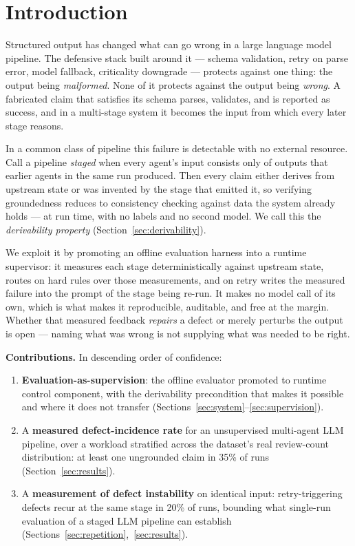 \documentclass[runningheads]{llncs}
\begin{document}
\section{Introduction}
\label{sec:intro}

Structured output has changed what can go wrong in a large language model
pipeline. The defensive stack built around it --- schema validation, retry on
parse error, model fallback, criticality downgrade --- protects against one
thing: the output being \emph{malformed}. None of it protects against the output
being \emph{wrong}. A
fabricated claim that satisfies its schema parses, validates, and is reported as
success, and in a multi-stage system it becomes the input from which every later
stage reasons.

In a common class of pipeline this failure is detectable with no external
resource. Call a pipeline \emph{staged} when every agent's input consists only of
outputs that earlier agents in the same run produced. Then every claim either
derives from upstream state or was invented by the stage that emitted it, so
verifying groundedness reduces to consistency checking against data the system
already holds --- at run time, with no labels and no second model. We call this
the \emph{derivability property} (Section~\ref{sec:derivability}).

We exploit it by promoting an offline evaluation harness into a runtime
supervisor: it measures each stage deterministically against upstream state,
routes on hard rules over those measurements, and on retry writes the measured
failure into the prompt of the stage being re-run. It makes no model call of its
own, which is what makes it reproducible, auditable, and free at the margin.
Whether that measured feedback \emph{repairs} a defect or merely perturbs the
output is open --- naming what was wrong is not supplying what was needed to be
right.

\medskip
\noindent\textbf{Contributions.} In descending order of confidence:
\begin{enumerate}
\item \textbf{Evaluation-as-supervision}: the offline evaluator promoted to
      runtime control component, with the derivability precondition that makes it
      possible and where it does not transfer
      (Sections~\ref{sec:system}--\ref{sec:supervision}).
\item A \textbf{measured defect-incidence rate} for an unsupervised multi-agent
      LLM pipeline, over a workload stratified across the dataset's real
      review-count distribution: at least one ungrounded claim in 35\% of runs
      (Section~\ref{sec:results}).
\item A \textbf{measurement of defect instability} on identical input:
      retry-triggering defects recur at the same stage in 20\% of runs, bounding
      what single-run evaluation of a staged LLM pipeline can establish
      (Sections~\ref{sec:repetition},~\ref{sec:results}).
\end{enumerate}
\end{document}
